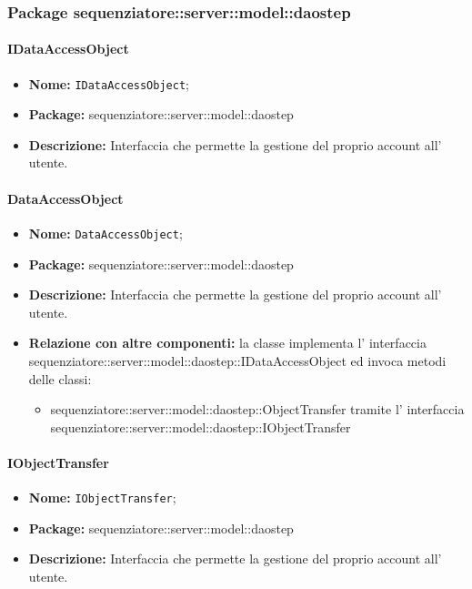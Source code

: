 \subsubsection{Package sequenziatore::server::model::daostep}
\paragraph{IDataAccessObject}
	\begin{itemize}
		\item \textbf{Nome:} \texttt{IDataAccessObject};
		\item \textbf{Package:} sequenziatore::server::model::daostep
		\item \textbf{Descrizione:} Interfaccia che permette la gestione del proprio account all' utente.
	\end{itemize}
\paragraph{DataAccessObject}
	\begin{itemize}
		\item \textbf{Nome:} \texttt{DataAccessObject};
		\item \textbf{Package:} sequenziatore::server::model::daostep
		\item \textbf{Descrizione:} Interfaccia che permette la gestione del proprio account all' utente.
		\item \textbf{Relazione con altre componenti:} la classe implementa l' interfaccia sequenziatore::server::model::daostep::IDataAccessObject ed invoca metodi delle classi:
		\begin{itemize}
			\item sequenziatore::server::model::daostep::ObjectTransfer tramite l' interfaccia sequenziatore::server::model::daostep::IObjectTransfer
	\end{itemize}
	\end{itemize}
\paragraph{IObjectTransfer}
	\begin{itemize}
		\item \textbf{Nome:} \texttt{IObjectTransfer};
		\item \textbf{Package:} sequenziatore::server::model::daostep
		\item \textbf{Descrizione:} Interfaccia che permette la gestione del proprio account all' utente.
	\end{itemize}
